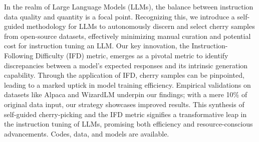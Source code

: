 In the realm of Large Language Models (LLMs), the balance between instruction data quality and quantity is a focal point. Recognizing this, we introduce a self-guided methodology for LLMs to autonomously discern and select cherry samples from open-source datasets, effectively minimizing manual curation and potential cost for instruction tuning an LLM. Our key innovation, the Instruction-Following Difficulty (IFD) metric, emerges as a pivotal metric to identify discrepancies between a model's expected responses and its intrinsic generation capability. Through the application of IFD, cherry samples can be pinpointed, leading to a marked uptick in model training efficiency. Empirical validations on datasets like Alpaca and WizardLM underpin our findings; with a mere 10\% of original data input, our strategy showcases improved results. This synthesis of self-guided cherry-picking and the IFD metric signifies a transformative leap in the instruction tuning of LLMs, promising both efficiency and resource-conscious advancements. Codes, data, and models are available.